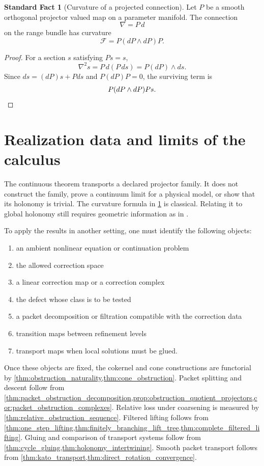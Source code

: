 \documentclass{aomart}
\theoremstyle{definition}
\newtheorem{standardfact}[standardfact]{Standard Fact}
\theoremstyle{remark}
\newcommand{\Fcal}{\mathcal F}
\begin{document}
\begin{standardfact}[Curvature of a projected connection]\label{fact:projected_curvature}
Let $P$ be a smooth orthogonal projector valued map on a parameter manifold.  The connection
\[
\nabla=P\,d
\]
on the range bundle has curvature
\[
\Fcal=P(dP\wedge dP)P.
\]
\end{standardfact}

\begin{proof}
For a section $s$ satisfying $Ps=s$,
\[
\nabla^2s=P\,d(P\,ds)=P(dP)\wedge ds.
\]
Since $ds=(dP)s+Pds$ and $P(dP)P=0$, the surviving term is
\[
P(dP\wedge dP)Ps.\qedhere
\]
\end{proof}

\section{Realization data and limits of the calculus}\label{sec:scope}

The continuous theorem transports a declared projector family.  It does not construct the family, prove a continuum limit for a physical model, or show that its holonomy is trivial.  The curvature formula in \cref{fact:projected_curvature} is classical.  Relating it to global holonomy still requires geometric information as in \cite{Kato1950,Kato1995,KobayashiNomizu1963}.

To apply the results in another setting, one must identify the following objects:
\begin{enumerate}
\item an ambient nonlinear equation or continuation problem
\item the allowed correction space
\item a linear correction map or a correction complex
\item the defect whose class is to be tested
\item a packet decomposition or filtration compatible with the correction data
\item transition maps between refinement levels
\item transport maps when local solutions must be glued.
\end{enumerate}

Once these objects are fixed, the cokernel and cone constructions are functorial by \cref{thm:obstruction_naturality,thm:cone_obstruction}.  Packet splitting and descent follow from \cref{thm:packet_obstruction_decomposition,prop:obstruction_quotient_projectors,cor:packet_obstruction_complexes}.  Relative loss under coarsening is measured by \cref{thm:relative_obstruction_sequence}.  Filtered lifting follows from \cref{thm:one_step_lifting,thm:finitely_branching_lift_tree,thm:complete_filtered_lifting}.  Gluing and comparison of transport systems follow from \cref{thm:cycle_gluing,thm:holonomy_intertwining}.  Smooth packet transport follows from \cref{thm:kato_transport,thm:direct_rotation_convergence}.
\end{document}

